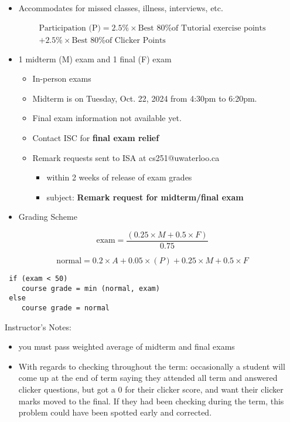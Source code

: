 \begin{frame}[fragile]
\begin{itemize}
         \item Accommodates for missed classes, illness, interviews, etc.
         
\end{itemize}
 \begin{align*}
        \text{Participation (P)} = 2.5\% \times \text{Best 80\% of Tutorial exercise points} \\+ 2.5\% \times \text{Best 80\% of Clicker Points}
    \end{align*}
\end{frame}

\begin{frame}[fragile]
\begin{itemize}
    \item 1 midterm (M) exam and 1 final (F) exam
    \begin{itemize}
    \item In-person exams
 \item Midterm is on Tuesday, Oct. 22, 2024 from 4:30pm to 6:20pm.
 \item Final exam information not available yet.
 \item Contact ISC for \textbf{final exam relief}
       \item Remark requests sent to ISA at cs251@uwaterloo.ca 
        \begin{itemize}
            \item within 2 weeks of release of exam grades
            \item subject: \textbf{Remark request for midterm/final exam}
        \end{itemize}
    \end{itemize}

\item Grading Scheme
\end{itemize}
 \[ \text{exam} = \frac{(0.25 \times M + 0.5 \times F)}{0.75} \]
 
 \[ \text{normal} = 0.2 \times A + 0.05 \times (P) + 0.25 \times M + 0.5 \times F \]
\begin{verbatim}
 if (exam < 50)
    course grade = min (normal, exam)
 else 
    course grade = normal
 \end{verbatim}


\BNotes\ifnum{}
Instructor's Notes:
\begin{itemize}
\item you must pass weighted average of midterm and final exams
	\item With regards to checking throughout the term: occasionally a student
		will come up at the end of term saying they attended all term and
		answered clicker questions, but got a 0 for their clicker score, and
		want their clicker marks moved to the final.  If they had been
		checking during the term, this problem could have been spotted
		early and corrected.


\end{itemize}
\end{frame}
